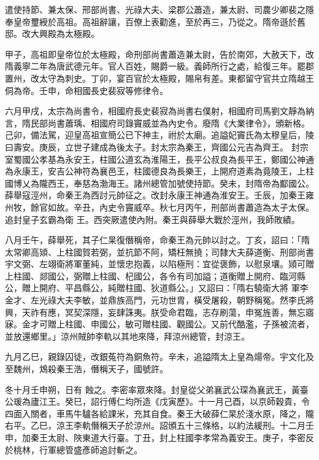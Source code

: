 \begin{pinyinscope}
 遣使持節、兼太保、邢部尚書、光祿大夫、梁郡公蕭造，兼太尉、司農少卿裴之隱奉皇帝璽綬於高祖。高祖辭讓，百僚上表勸進，至於再三，乃從之。隋帝遜於舊邸。改大興殿為太極殿。



 甲子，高祖即皇帝位於太極殿，命刑部尚書蕭造兼太尉，告於南郊，大赦天下，改隋義寧二年為唐武德元年。官人百姓，賜爵一級。義師所行之處，給復三年。罷郡
 置州，改太守為刺史。丁卯，宴百官於太極殿，賜帛有差。東都留守官共立隋越王侗為帝。壬申，命相國長史裴寂等修律令。



 六月甲戌，太宗為尚書令，相國府長史裴寂為尚書右僕射，相國府司馬劉文靜為納言，隋民部尚書蕭瑀、相國府司錄竇威並為內史令。廢隋《大業律令》，頒新格。己卯，備法駕，迎皇高祖宣簡公已下神主，祔於太廟。追謚妃竇氏為太穆皇后，陵曰壽安。庚辰，立世子建成為後太子。封太宗為秦王，齊國公元吉為齊王。
 封宗室蜀國公孝基為永安王，柱國公道玄為淮陽王，長平公叔良為長平王，鄭國公神通為永康王，安吉公神符為襄邑王，柱國德良為長樂王，上開府道素為竟陵王，上柱國博乂為隴西王，奉慈為渤海王。諸州總管加號使持節。癸未，封隋帝為酅國公。薛舉寇涇州，命秦王為西討元帥征之。改封永康王神通為淮安王。壬辰，加秦王雍州牧，餘官如故。辛丑，內史令竇威卒。秋七月丙午，刑部尚書蕭造為太子太保。追封皇子玄霸為衛
 王。西突厥遣使內附。秦王與薛舉大戰於涇州，我師敗績。



 八月壬午，薛舉死，其子仁杲復僭稱帝，命秦王為元帥以討之。丁亥，詔曰：「隋太常卿高熲、上柱國賀若弼，並抗節不阿，矯枉無撓；司隸大夫薛道衡、刑部尚書宇文弼、左翊衛將軍董純，並懷忠抱義，以陷極刑：宜從褒飾，以慰泉壤。熲可贈上柱國、郯國公，弼贈上柱國、杞國公，各令有司加謚；道衡贈上開府、臨河縣公，贈上開府、平昌縣公，純贈柱國、狄道縣公。」又詔曰：「隋右驍衛大將
 軍李金才、左光祿大夫李敏，並鼎族高門，元功世胄，橫受屠殺，朝野稱冤。然李氏將興，天祚有應，冥契深隱，妄肆誅夷。朕受命君臨，志存刷蕩，申冤旌善，無忘寤寐。金才可贈上柱國、申國公，敏可贈柱國、觀國公。又前代酷濫，子孫被流者，並放還鄉里。」涼州賊帥李軌以其地來降，拜涼州總管，封涼王。



 九月乙巳，親錄囚徒，改銀菟符為銅魚符。辛未，追謚隋太上皇為煬帝。宇文化及至魏州，鴆殺秦王浩，僭稱天子，國號許。



 冬十月壬申朔，日有
 蝕之。李密率眾來降。封皇從父弟襄武公琛為襄武王，黃臺公瑗為廬江王。癸巳，詔行傅仁均所造《戊寅歷》。十一月己酉，以京師穀貴，令四面入關者，車馬牛驢各給課米，充其自食。秦王大破薛仁杲於淺水原，降之，隴右平。乙巳，涼王李軌僭稱天子於涼州。詔頒五十三條格，以約法緩刑。十二月壬申，加秦王太尉、陜東道大行臺。丁丑，封上柱國李孝常為義安王。庚子，李密反於桃林，行軍總管盛彥師追討斬之。




\end{pinyinscope}
